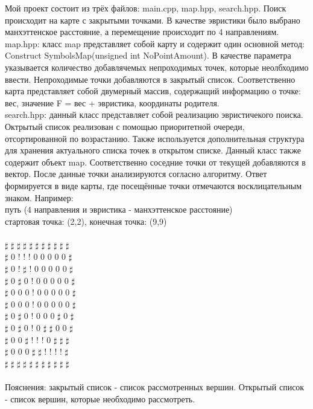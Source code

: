 \documentclass[12pt]{article}
\begin{document}
Мой проект состоит из трёх файлов: main.cpp, map.hpp, search.hpp. Поиск происходит на карте с закрытыми точками. В качестве эвристики было выбрано манхэттенское расстояние, а перемещение происходит по 4 направлениям.\\
map.hpp: класс map представляет собой карту и содержит один основной метод: Construct SymbolsMap(unsigned int NoPointAmount). В качестве параметра указывается количество добавлячемых непроходимых точек, которые неолбходимо ввести. Непроходимые точки добавляются в закрытый список. Соответственно карта представляет собой двумерный массив, содержащий информацию о точке: вес, значение F = вес + эвристика, координаты родителя.\\
search.hpp: данный класс представляет собой реализацию эвристичекого поиска. Октрытый список реализован с помощью приоритетной очереди, отсортированной по возрастанию. Также используется дополнительная структура для хранения актуального списка точек в открытом списке. Данный класс также содержит объект map. Соответственно соседние точки от текущей добавляются в вектор. После данные точки анализируются согласно алгоритму. Ответ формируется в виде карты, где посещённые точки отмечаются восклицательным знаком. Например:
\\
путь (4 направления и эвристика - манхэттенское расстояние)\\
стартовая точка: (2,2), конечная точка: (9,9)\\
\\
$\sharp$ $\sharp$ $\sharp$ $\sharp$ $\sharp$ $\sharp$ $\sharp$ $\sharp$ $\sharp$ $\sharp$ $\sharp$\\
$\sharp$ 0 ! ! ! 0 0 0 0 0 $\sharp$\\
$\sharp$ 0 ! $\sharp$ ! 0 0 0 0 0 $\sharp$\\
$\sharp$ 0 $\sharp$ 0 ! 0 0 0 0 0 $\sharp$\\
$\sharp$ 0 0 0 ! 0 0 0 0 0 $\sharp$\\
$\sharp$ 0 0 0 ! 0 0 0 0 0 $\sharp$\\
$\sharp$ 0 $\sharp$ 0 ! 0 0 0 $\sharp$ 0 $\sharp$\\
$\sharp$ 0 $\sharp$ 0 ! 0 $\sharp$ $\sharp$ 0 0 $\sharp$\\
$\sharp$ 0 0 $\sharp$ ! ! ! 0 $\sharp$ $\sharp$ $\sharp$\\
$\sharp$ 0 0 0 $\sharp$ $\sharp$ ! ! ! ! $\sharp$\\
$\sharp$ $\sharp$ $\sharp$ $\sharp$ $\sharp$ $\sharp$ $\sharp$ $\sharp$ $\sharp$ $\sharp$ $\sharp$\\
\\
Пояснения: закрытый список - список рассмотренных вершин. Открытый список - список вершин, которые необходимо рассмотреть.
\end{document}
